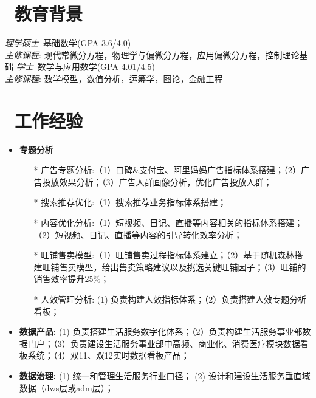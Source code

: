 \documentclass{resume}
\begin{document}


 
\section{\faGraduationCap\  教育背景}
\textit{理学硕士}\ 基础数学(GPA 3.6/4.0)\\
\textit{主修课程}:
现代常微分方程，物理学与偏微分方程，应用偏微分方程，控制理论基础
\textit{学士}\ 数学与应用数学(GPA 4.01/4.5)\\
\textit{主修课程}:
数学模型，数值分析，运筹学，图论，金融工程

\section{\faUsers\ 工作经验}
\role{资深数据分析师}{}
\begin{onehalfspacing}
  \begin{itemize}
    \item \textbf{专题分析}
    \begin{itemize}
      \item[*] 广告专题分析:（1）口碑\&支付宝、阿里妈妈广告指标体系搭建；（2）广告投放效果分析；（3）广告人群画像分析，优化广告投放人群；
      \item[*] 搜索推荐优化:（1）搜索推荐业务指标体系搭建；
      \item[*] 内容优化分析:（1）短视频、日记、直播等内容相关的指标体系搭建；（2）短视频、日记、直播等内容的引导转化效率分析；
      \item[*] 旺铺售卖模型:（1）旺铺售卖过程指标体系建立；（2）基于随机森林搭建旺铺售卖模型，给出售卖策略建议以及挑选关键旺铺因子；（3）旺铺的销售效率提升25\%； 
      \item[*] 人效管理分析: (1) 负责构建人效指标体系；（2）负责搭建人效专题分析看板；
    \end{itemize}
    \item \textbf{数据产品:} (1) 负责搭建生活服务数字化体系；（2）负责构建生活服务事业部数据门户；（3）负责建设生活服务事业部中高频、商业化、消费医疗模块数据看板系统；（4）双11、双12实时数据看板产品；
    \item \textbf{数据治理:} (1) 统一和管理生活服务行业口径； (2) 设计和建设生活服务垂直域数据（dws层或adm层）；
  \end{itemize}
\end{onehalfspacing}
\end{document}
